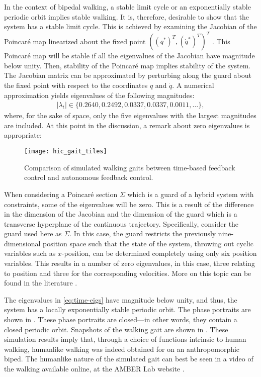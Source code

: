 In the context of bipedal walking, a stable limit cycle or an exponentially
stable periodic orbit implies stable walking. It is, therefore, desirable to
show that the system has a stable limit cycle. This is achieved by examining the
Jacobian of the Poincar{\'e} map linearized about the fixed point $((q^*)^T,
({\dot q}^*)^T)^T$ \cite{Parker1989}. This Poincar{\'e} map will be stable if
all the eigenvalues of the Jacobian have magnitude below unity. Then, stability
of the Poincar{\'e} map implies stability of the system. The Jacobian matrix can
be approximated by perturbing along the guard about the fixed point with respect
to the coordinates $q$ and ${\dot q}$. A numerical approximation yields
eigenvalues of the following magnitudes:
\begin{align}
  \label{eq:time-eigs}
  |\lambda_t| \in \{0.2640, 0.2492, 0.0337, 0.0337, 0.0011, \ldots\},
\end{align}
where, for the sake of space, only the five eigenvalues with the largest magnitudes are included. At this point in the discussion, a remark about zero eigenvalues is appropriate:


\begin{figure*}[p!]
  \centering
  \texttt{[image: hic\_gait\_tiles]}
  \caption[Comparison of simulated walking gaits]{Comparison of simulated walking gaits between time-based feedback control and autonomous feedback control.}
  \label{fig:gaittiles}
\end{figure*}

\begin{remark}
  When considering a Poincar{\'e} section $\Sigma$ which is a guard of a hybrid
  system with constraints, some of the eigenvalues will be zero. This is a
  result of the difference in the dimension of the Jacobian and the dimension of
  the guard which is a transverse hyperplane of the continuous
  trajectory. Specifically, consider the guard used here as $\Sigma$. In this
  case, the guard restricts the previously nine-dimensional position space such
  that the state of the system, throwing out cyclic variables such as
  $x$-position, can be determined completely using only six position
  variables. This results in a number of zero eigenvalues, in this case, three
  relating to position and three for the corresponding velocities. More on this
  topic can be found in the literature \cite{Wendel2010}.
\end{remark}

The eigenvalues in \eqref{eq:time-eigs} have magnitude below unity, and thus,
the system has a locally exponentially stable periodic orbit. The phase
portraits are shown in . These phase portraits are closed---in
other words, they contain a closed periodic orbit. Snapshots of the walking gait
are shown in . These simulation results imply that,
through a choice of functions intrinsic to human walking, humanlike walking was
indeed obtained for on an anthropomorphic biped. The humanlike nature of the
simulated gait can best be seen in a video of the walking available online, at
the AMBER Lab website \cite{url:bipedalrobotics}.

